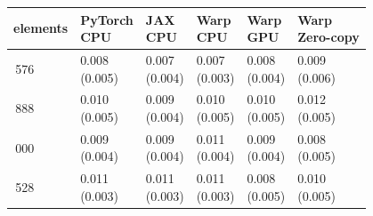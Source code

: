 \begin{table}[H]\centering\begin{tabular}{>{\centering\arraybackslash}m{2.0cm}|>{\centering\arraybackslash}m{1.9cm}>{\centering\arraybackslash}m{1.9cm}>{\centering\arraybackslash}m{1.9cm}>{\centering\arraybackslash}m{1.9cm}>{\centering\arraybackslash}m{1.9cm}}
\toprule
elements & \makecell{PyTorch\\CPU} & \makecell{JAX\\CPU} & \makecell{Warp\\CPU} & \makecell{Warp\\GPU} & \makecell{Warp\\Zero-copy} \\
\midrule
24\,576 & \makecell{0.008 \\[-4pt] (0.005)} & \makecell{0.007 \\[-4pt] (0.004)} & \makecell{0.007 \\[-4pt] (0.003)} & \makecell{0.008 \\[-4pt] (0.004)} & \makecell{0.009 \\[-4pt] (0.006)} \\
63\,888 & \makecell{0.010 \\[-4pt] (0.005)} & \makecell{0.009 \\[-4pt] (0.004)} & \makecell{0.010 \\[-4pt] (0.005)} & \makecell{0.010 \\[-4pt] (0.005)} & \makecell{0.012 \\[-4pt] (0.005)} \\
162\,000 & \makecell{0.009 \\[-4pt] (0.004)} & \makecell{0.009 \\[-4pt] (0.004)} & \makecell{0.011 \\[-4pt] (0.004)} & \makecell{0.009 \\[-4pt] (0.004)} & \makecell{0.008 \\[-4pt] (0.005)} \\
444\,528 & \makecell{0.011 \\[-4pt] (0.003)} & \makecell{0.011 \\[-4pt] (0.003)} & \makecell{0.011 \\[-4pt] (0.003)} & \makecell{0.008 \\[-4pt] (0.005)} & \makecell{0.010 \\[-4pt] (0.005)} \\
\bottomrule

\end{tabular}
\end{table}
